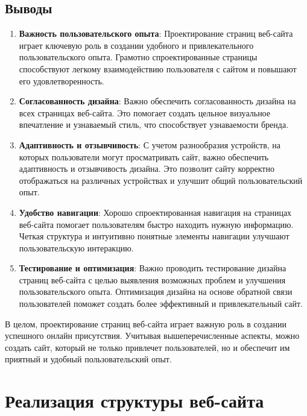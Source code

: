 \documentclass{article}
\begin{document}
    \subsection{Выводы}

    \begin{enumerate}
        \item \textbf{Важность пользовательского опыта}: Проектирование страниц веб-сайта играет ключевую роль в создании удобного и привлекательного пользовательского опыта. Грамотно спроектированные страницы способствуют легкому взаимодействию пользователя с сайтом и повышают его удовлетворенность.
        
        \item \textbf{Согласованность дизайна}: Важно обеспечить согласованность дизайна на всех страницах веб-сайта. Это помогает создать цельное визуальное впечатление и узнаваемый стиль, что способствует узнаваемости бренда.
        
        \item \textbf{Адаптивность и отзывчивость}: С учетом разнообразия устройств, на которых пользователи могут просматривать сайт, важно обеспечить адаптивность и отзывчивость дизайна. Это позволит сайту корректно отображаться на различных устройствах и улучшит общий пользовательский опыт.
        
        \item \textbf{Удобство навигации}: Хорошо спроектированная навигация на страницах веб-сайта помогает пользователям быстро находить нужную информацию. Четкая структура и интуитивно понятные элементы навигации улучшают пользовательскую интеракцию.
        
        \item \textbf{Тестирование и оптимизация}: Важно проводить тестирование дизайна страниц веб-сайта с целью выявления возможных проблем и улучшения пользовательского опыта. Оптимизация дизайна на основе обратной связи пользователей поможет создать более эффективный и привлекательный сайт.
    \end{enumerate}

    В целом, проектирование страниц веб-сайта играет важную роль в создании успешного онлайн присутствия. Учитывая вышеперечисленные аспекты, можно создать сайт, который не только привлечет пользователей, но и обеспечит им приятный и удобный пользовательский опыт.






    \section{Реализация структуры веб-сайта}
\end{document}
